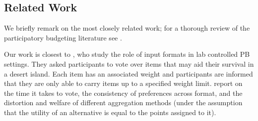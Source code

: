 \documentclass{comsoc2023}
\begin{document}
\subsection{Related Work}\label{sec:related}
We briefly remark on the most closely related work; for a thorough review of the participatory budgeting literature see \citet{aziz2021participatory}.

Our work is closest to  \citet{benade2018efficiency}, who study the role of input formats in lab controlled PB settings. They asked participants  to vote over items that may aid their survival in a desert island. Each item has an associated weight and participants are informed that they are only able to carry items up to a specified weight limit. %
\citet{benade2018efficiency} report on the time it takes to vote, the consistency of preferences across format, and the distortion and welfare of different aggregation methods (under the assumption that the utility of an alternative is equal to the points assigned to it). %
\end{document}
